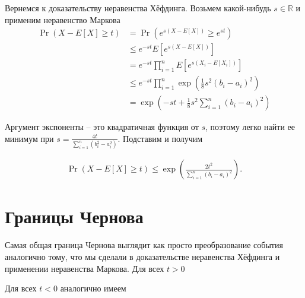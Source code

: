 \documentclass[12pt]{article}
\newcommand\R{\mathbb{R}}
\begin{document}
Вернемся к доказательству неравенства Хёфдинга. Возьмем какой-нибудь $s \in \R$ и применим неравенство Маркова
\begin{align*}
  \Pr(X - E[X] \ge t) &= \Pr(e^{s(X - E[X])} \ge e^{st}) \\
                      &\le e^{-st} E[e^{s(X - E[X])}] \\
                      &= e^{-st} \prod_{i = 1}^n E[e^{s(X_i - E[X_i])}] \\
                      &\le e^{-st} \prod_{i = 1}^n \exp\left(\frac{1}{8}s^2(b_i - a_i)^2\right) \\
                      &= \exp\left(-st + \frac{1}{8}s^2 \sum_{i = 1}^n (b_i - a_i)^2\right)
\end{align*}

Аргумент экспоненты -- это квадратичная функция от $s$, поэтому легко найти ее минимум при $s = \frac{4t}{\sum_{i = 1}^n (b_i^2 - a_i^2)}$. Подставим и получим

\begin{align*}
  \Pr(X - E[X] \ge t) \le \exp\left(\frac{2t^2}{\sum_{i = 1}^n (b_i - a_i)^2}\right).
\end{align*}

\section{Границы Чернова}

Самая общая граница Чернова выглядит как просто преобразование события аналогично тому, что мы сделали в доказательстве неравенства Хёфдинга и применении неравенства Маркова. Для всех $t > 0$
\begin{center}
\end{center}

Для всех $t < 0$ аналогично имеем
\begin{center}
\end{center}
\end{document}
